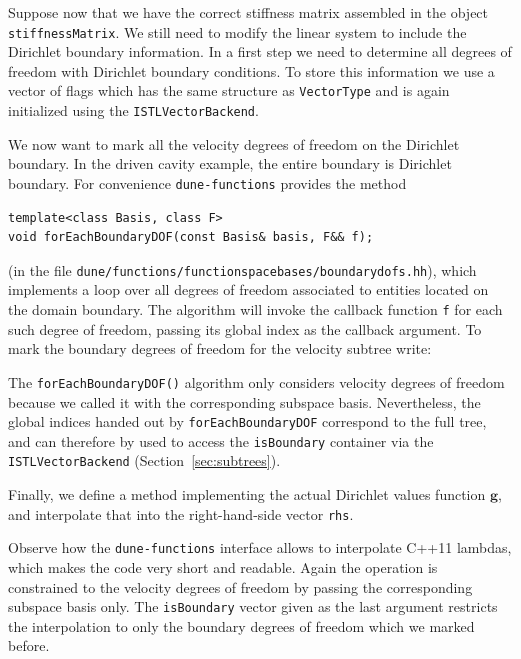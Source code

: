 \documentclass[a4paper,10pt,headings=normal,bibliography=totoc]{scrartcl}
\newcommand{\cpp}[1]{\lstinline[basicstyle=\ttfamily]!#1!}
\newcommand{\dunemodule}[1]{\texttt{#1}}
\newcommand{\file}[1]{\texttt{#1}}
\begin{document}
Suppose now that we have the correct stiffness matrix assembled in the object \cpp{stiffnessMatrix}.  We still need
to modify the linear system to include the Dirichlet boundary information.
In a first step we need to determine all degrees of freedom with Dirichlet boundary conditions.
To store this information we use a vector of flags which has the same structure
as \cpp{VectorType} and is again initialized using the \cpp{ISTLVectorBackend}.
%

%
We now want to mark all the velocity degrees of freedom on the Dirichlet boundary.
In the driven cavity example, the entire boundary is Dirichlet boundary.
For convenience \dunemodule{dune-functions} provides the method
\begin{lstlisting}[style=Interface]
template<class Basis, class F>
void forEachBoundaryDOF(const Basis& basis, F&& f);
\end{lstlisting}
(in the file \file{dune/functions/functionspacebases/boundarydofs.hh}),
which implements a loop over all degrees of freedom associated to entities located
on the domain boundary. The algorithm will invoke the callback function \cpp{f}
for each such degree of freedom, passing its global index as the callback argument.
To mark the boundary degrees of freedom for the velocity subtree write:
%

%
The \cpp{forEachBoundaryDOF()} algorithm only considers velocity
degrees of freedom because we called it with the corresponding subspace basis.
Nevertheless, the global indices handed out by \cpp{forEachBoundaryDOF} correspond
to the full tree, and can therefore by used to access the \cpp{isBoundary}
container via the \cpp{ISTLVectorBackend} (Section~\ref{sec:subtrees}).

Finally, we define a method implementing the actual Dirichlet values function $\mathbf{g}$, and interpolate
that into the right-hand-side vector \cpp{rhs}.
%

%
Observe how the \dunemodule{dune-functions} interface allows to interpolate C++11 lambdas, which makes the code
very short and readable. Again the operation is constrained to the velocity degrees of freedom
by passing the corresponding subspace basis only.
The \cpp{isBoundary} vector given as the last argument restricts the interpolation
to only the boundary degrees of freedom which we marked before.
\end{document}
